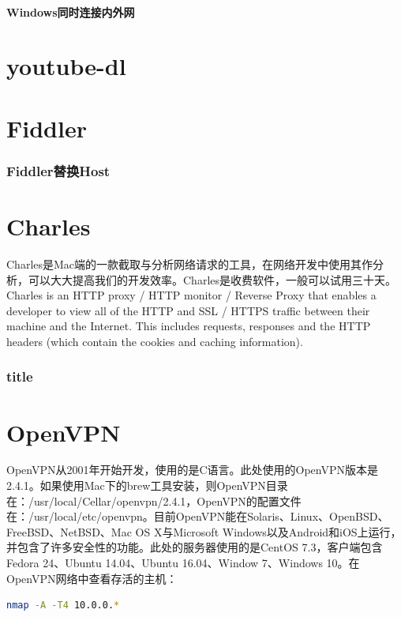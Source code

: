 \documentclass[letter]{book}
\begin{document}
\subsubsection{Windows同时连接内外网}

\chapter{youtube-dl}

\chapter{Fiddler}

\subsection{Fiddler替换Host}

\chapter{Charles}

Charles是Mac端的一款截取与分析网络请求的工具，在网络开发中使用其作分析，可以大大提高我们的开发效率。Charles是收费软件，一般可以试用三十天。Charles is an HTTP proxy / HTTP monitor / Reverse Proxy that enables a developer to view all of the HTTP and SSL / HTTPS traffic between their machine and the Internet. This includes requests, responses and the HTTP headers (which contain the cookies and caching information).

\subsection{title}


\chapter{OpenVPN}

OpenVPN从2001年开始开发，使用的是C语言。此处使用的OpenVPN版本是2.4.1。如果使用Mac下的brew工具安装，则OpenVPN目录在：/usr/local/Cellar/openvpn/2.4.1，OpenVPN的配置文件在：/usr/local/etc/openvpn。目前OpenVPN能在Solaris、Linux、OpenBSD、FreeBSD、NetBSD、Mac OS X与Microsoft Windows以及Android和iOS上运行，并包含了许多安全性的功能。此处的服务器使用的是CentOS 7.3，客户端包含Fedora 24、Ubuntu 14.04、Ubuntu 16.04、Window 7、Windows 10。在OpenVPN网络中查看存活的主机：

\begin{lstlisting}[language=bash]
nmap -A -T4 10.0.0.*
\end{lstlisting}
\end{document}
